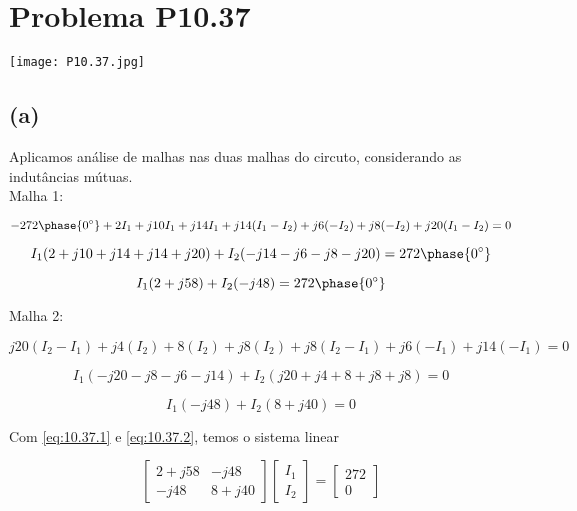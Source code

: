 
\section*{Problema P10.37}

\renewcommand*\thesection{10.37}

\begin{center}
    \texttt{[image: P10.37.jpg]}
\end{center}

\subsection*{(a)}

Aplicamos análise de malhas nas duas malhas do circuto, considerando as indutâncias mútuas. \\
Malha 1:

\[ - 272\phase{0^{\circ}} + 2I_1 + j10I_1 + j14I_1 + j14(I_1 - I_2) + j6(-I_2) + j8(-I_2) + j20(I_1 - I_2) = 0  \]

\[ I_1(2 + j10 + j14 + j14 + j20) + I_2(-j14 -j6 - j8 - j20) = 272\phase{0^{\circ}}  \]

\begin{equation}\label{eq:10.37.1}
    I_1(2 + j58) + I_2(-j48) = 272\phase{0^{\circ}}
\end{equation}

Malha 2:

\[ j20(I_2 - I_1) + j4(I_2) + 8(I_2) + j8(I_2) + j8(I_2 - I_1) + j6(-I_1) + j14(-I_1)  = 0 \]

\[ I_1(-j20 - j8 - j6 - j14) + I_2(j20 + j4 + 8 + j8 + j8)  = 0 \]

\begin{equation}\label{eq:10.37.2}
    I_1(-j48) + I_2(8 + j40) = 0
\end{equation}

Com \eqref{eq:10.37.1} e \eqref{eq:10.37.2}, temos o sistema linear

\begingroup
\renewcommand*{\arraystretch}{1.5}

\[
    \begin{bmatrix}
        2 + j58 & -j48    \\
        -j48    & 8 + j40
    \end{bmatrix}
    \begin{bmatrix}
        I_1 \\
        I_2
    \end{bmatrix}
    =
    \begin{bmatrix}
        272 \\
        0
    \end{bmatrix}
\]

